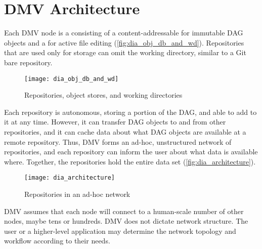 \chapter{DMV Architecture}

Each \gls{DMV} node is a  consisting of a
content-addressable  for immutable \gls{DAG} objects and a
 for active file editing
(\autoref{fig:dia_obj_db_and_wd}). Repositories that are used only for storage
can omit the working directory, similar to a Git bare repository.

\begin{figure}[h]
  \centering
    \texttt{[image: dia\_obj\_db\_and\_wd]}
  \caption{Repositories, object stores, and working directories}
  \label{fig:dia_obj_db_and_wd}
\end{figure}

Each repository is autonomous, storing a portion of the \gls{DAG}, and able to
add to it at any time. However, it can transfer \gls{DAG} objects to and from
other repositories, and it can cache data about what \gls{DAG} objects are
available at a remote repository. Thus, \gls{DMV} forms an ad-hoc, unstructured
network of repositories, and each repository can inform the user about what data
is available where. Together, the repositories hold the entire data set
(\autoref{fig:dia_architecture}).

\begin{figure}[h]
  \centering
    \texttt{[image: dia\_architecture]}
  \caption{Repositories in an ad-hoc network}
  \label{fig:dia_architecture}
\end{figure}

\gls{DMV} assumes that each node will connect to a human-scale number of other
nodes, maybe tens or hundreds. \gls{DMV} does not dictate network structure. The
user or a higher-level application may determine the network topology and
workflow according to their needs.
